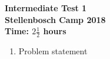 \documentclass{article}
\begin{document}
\begin{center}
\textbf{\Large Intermediate Test 1}
\\ \vspace{1em}
\textbf{\large Stellenbosch Camp 2018}
\\ \vspace{1em}
\textbf{\large Time: $2\frac{1}{2}$ hours}
\end{center}

\begin{enumerate}[1.]

\item %
Problem statement

\end{enumerate}
\end{document}
